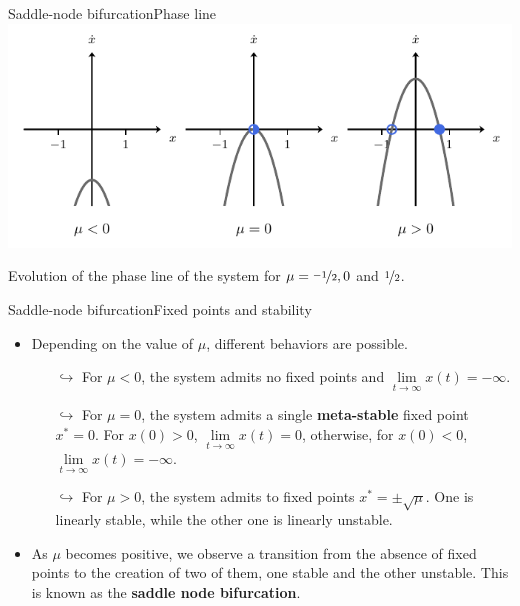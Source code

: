 \documentclass[usenames,dvipsnames,svgnames,10pt,aspectratio=169]{beamer}
\begin{document}
\begin{frame}[t, c]{Saddle-node bifurcation}{Phase line}
	\centering
	\includegraphics[width=.75\textwidth]{saddle_node_phase_line}

	Evolution of the phase line of the system for $\mu = \nicefrac{-1}{2}, 0$ and $\nicefrac{1}{2}$.

	\vspace{1cm}
\end{frame}

\begin{frame}[t, c]{Saddle-node bifurcation}{Fixed points and stability}
	\begin{itemize}
		\item Depending on the value of $\mu$, different behaviors are possible.
		\begin{itemize}
			\item[$\hookrightarrow$] For $\mu < 0$, the system admits no fixed points and $\lim \limits_{t \to \infty} x(t) = - \infty$.

			\item[$\hookrightarrow$] For $\mu = 0$, the system admits a single \alert{\textbf{meta-stable}} fixed point $x^* = 0$. For $x(0) > 0$, $\lim \limits_{t \to \infty} x(t) = 0$, otherwise, for $x(0) < 0$, $\lim \limits_{t \to \infty} x(t) = -\infty$.

			\item[$\hookrightarrow$] For $\mu > 0$, the system admits to fixed points $x^* = \pm \sqrt{\mu}$. One is linearly stable, while the other one is linearly unstable.
		\end{itemize}

		\bigskip

		\item As $\mu$ becomes positive, we observe a transition from the absence of fixed points to the creation of two of them, one stable and the other unstable. This is known as the \alert{\textbf{saddle node bifurcation}}.
	\end{itemize}

	\vspace{1cm}
\end{frame}
\end{document}
